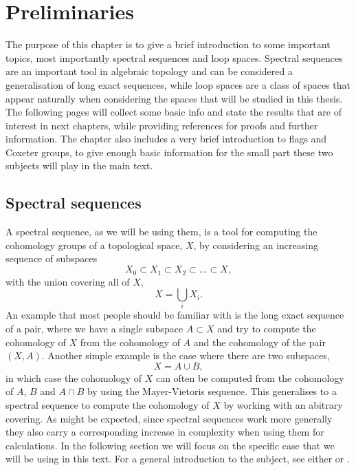 
\chapter{Preliminaries}
\label{chap:generelt}

The purpose of this chapter is to give a brief introduction to some
important topics, most importantly spectral sequences
and loop spaces. Spectral sequences are an important tool in algebraic
topology 
and can be considered a generalisation of long exact sequences, while
loop spaces are a class of spaces that appear naturally when
considering the spaces that will be studied in this thesis. The
following pages will collect some basic info and state the results
that are of interest in next chapters, while providing references for
proofs and further information. The chapter also includes a very brief
introduction to flags and Coxeter groups, to give enough basic
information for the small part these two subjects will play in the
main text.

\section{Spectral sequences}
\label{sec:ss}

A spectral sequence, as we will be using them, is a tool for computing
the cohomology groups of a topological space, $X$, by considering an
increasing sequence of subspaces
\[ X_0 \subset X_1 \subset X_2 \subset \dots \subset X, \]
with the union covering all of $X$,
\[ X = \bigcup_{i} X_i. \]
An example that most people should be familiar with is the long exact
sequence of a pair, where
we have a single subspace $A \subset X$ and try to compute the
cohomology of $X$ from the cohomology of $A$ and the cohomology of the
pair $(X,A)$. Another simple example
is the case where there are two subspaces,
\[ X = A \cup B, \]
in which case the cohomology of $X$ can often be computed from the
cohomology of $A$, $B$ and $A\cap B$ by using the Mayer-Vietoris
sequence. This generalises to a spectral sequence to compute
the cohomology of $X$ by working with an abitrary covering. As might
be expected, since spectral sequences work more generally they also
carry a corresponding increase in complexity when using them for
calculations. In the following section we will focus on the specific
case that 
we will be using in this text. For a general introduction to the
subject, see either \cite{hatcherss} or \cite{mccleary}.

